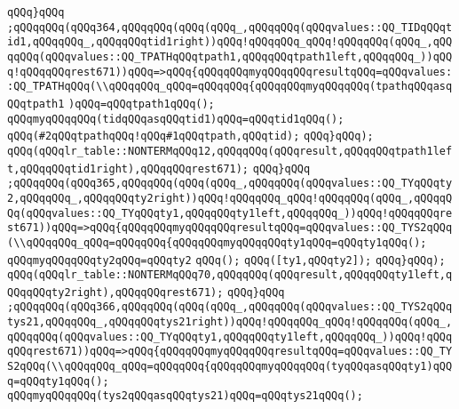 \verb|qQQq}qQQq|\newline
\verb|;qQQqqQQq(qQQq364,qQQqqQQq(qQQq(qQQq_,qQQqqQQq(qQQqvalues::QQ_TIDqQQqtid1,qQQqqQQq_,qQQqqQQqtid1right))qQQq!qQQqqQQq_qQQq!qQQqqQQq(qQQq_,qQQqqQQq(qQQqvalues::QQ_TPATHqQQqtpath1,qQQqqQQqtpath1left,qQQqqQQq_))qQQq!qQQqqQQqrest671))qQQq=>qQQq{qQQqqQQqmyqQQqqQQqresultqQQq=qQQqvalues::QQ_TPATHqQQq(\\qQQqqQQq_qQQq=qQQqqQQq{qQQqqQQqmyqQQqqQQq(tpathqQQqasqQQqtpath1|\newline
\verb|)qQQq=qQQqtpath1qQQq();|\newline
\verb|qQQqmyqQQqqQQq(tidqQQqasqQQqtid1)qQQq=qQQqtid1qQQq();|\newline
\verb|qQQq(#2qQQqtpathqQQq!qQQq#1qQQqtpath,qQQqtid);|\newline
\verb|qQQq}qQQq);|\newline
\verb|qQQq(qQQqlr_table::NONTERMqQQq12,qQQqqQQq(qQQqresult,qQQqqQQqtpath1left,qQQqqQQqtid1right),qQQqqQQqrest671);|\newline
\verb|qQQq}qQQq|\newline
\verb|;qQQqqQQq(qQQq365,qQQqqQQq(qQQq(qQQq_,qQQqqQQq(qQQqvalues::QQ_TYqQQqty2,qQQqqQQq_,qQQqqQQqty2right))qQQq!qQQqqQQq_qQQq!qQQqqQQq(qQQq_,qQQqqQQq(qQQqvalues::QQ_TYqQQqty1,qQQqqQQqty1left,qQQqqQQq_))qQQq!qQQqqQQqrest671))qQQq=>qQQq{qQQqqQQqmyqQQqqQQqresultqQQq=qQQqvalues::QQ_TYS2qQQq(\\qQQqqQQq_qQQq=qQQqqQQq{qQQqqQQqmyqQQqqQQqty1qQQq=qQQqty1qQQq();|\newline
\verb|qQQqmyqQQqqQQqty2qQQq=qQQqty2|\newline
\verb|qQQq();|\newline
\verb|qQQq([ty1,qQQqty2]);|\newline
\verb|qQQq}qQQq);|\newline
\verb|qQQq(qQQqlr_table::NONTERMqQQq70,qQQqqQQq(qQQqresult,qQQqqQQqty1left,qQQqqQQqty2right),qQQqqQQqrest671);|\newline
\verb|qQQq}qQQq|\newline
\verb|;qQQqqQQq(qQQq366,qQQqqQQq(qQQq(qQQq_,qQQqqQQq(qQQqvalues::QQ_TYS2qQQqtys21,qQQqqQQq_,qQQqqQQqtys21right))qQQq!qQQqqQQq_qQQq!qQQqqQQq(qQQq_,qQQqqQQq(qQQqvalues::QQ_TYqQQqty1,qQQqqQQqty1left,qQQqqQQq_))qQQq!qQQqqQQqrest671))qQQq=>qQQq{qQQqqQQqmyqQQqqQQqresultqQQq=qQQqvalues::QQ_TYS2qQQq(\\qQQqqQQq_qQQq=qQQqqQQq{qQQqqQQqmyqQQqqQQq(tyqQQqasqQQqty1)qQQq=qQQqty1qQQq();|\newline
\newline
\verb|qQQqmyqQQqqQQq(tys2qQQqasqQQqtys21)qQQq=qQQqtys21qQQq();|\newline
